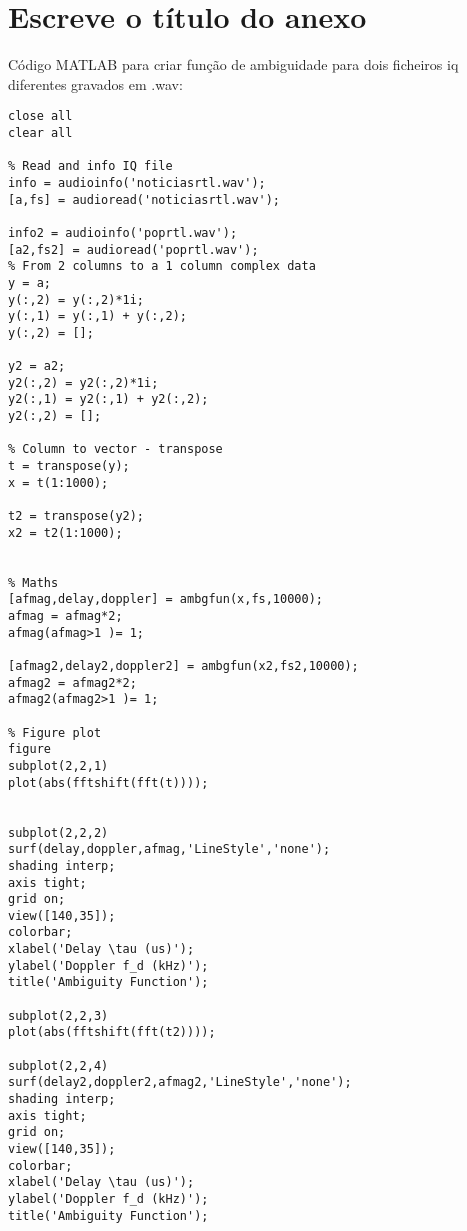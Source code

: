 
\chapter{Escreve o título do anexo} %

\label{Annex2} %

Código MATLAB para criar função de ambiguidade para dois ficheiros iq diferentes gravados em .wav:

\begin{verbatim}
close all
clear all

% Read and info IQ file
info = audioinfo('noticiasrtl.wav');
[a,fs] = audioread('noticiasrtl.wav');

info2 = audioinfo('poprtl.wav');
[a2,fs2] = audioread('poprtl.wav');
% From 2 columns to a 1 column complex data
y = a;
y(:,2) = y(:,2)*1i;
y(:,1) = y(:,1) + y(:,2);
y(:,2) = [];

y2 = a2;
y2(:,2) = y2(:,2)*1i;
y2(:,1) = y2(:,1) + y2(:,2);
y2(:,2) = [];

% Column to vector - transpose
t = transpose(y);
x = t(1:1000);

t2 = transpose(y2);
x2 = t2(1:1000);


% Maths
[afmag,delay,doppler] = ambgfun(x,fs,10000);
afmag = afmag*2;
afmag(afmag>1 )= 1;

[afmag2,delay2,doppler2] = ambgfun(x2,fs2,10000);
afmag2 = afmag2*2;
afmag2(afmag2>1 )= 1;

% Figure plot
figure
subplot(2,2,1)   
plot(abs(fftshift(fft(t))));


subplot(2,2,2)
surf(delay,doppler,afmag,'LineStyle','none'); 
shading interp;
axis tight; 
grid on; 
view([140,35]); 
colorbar;
xlabel('Delay \tau (us)');
ylabel('Doppler f_d (kHz)');
title('Ambiguity Function');

subplot(2,2,3)   
plot(abs(fftshift(fft(t2))));

subplot(2,2,4)   
surf(delay2,doppler2,afmag2,'LineStyle','none'); 
shading interp;
axis tight; 
grid on; 
view([140,35]); 
colorbar;
xlabel('Delay \tau (us)');
ylabel('Doppler f_d (kHz)');
title('Ambiguity Function');
\end{verbatim}
